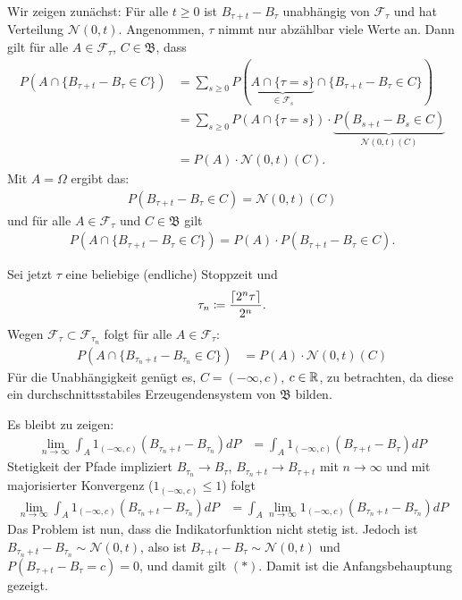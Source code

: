 \documentclass[a4paper,twoside,DIV15,BCOR12mm]{scrbook}
\newcommand{\cF}{\mathcal F}
\newcommand{\borel}{{\mathfrak B}}
\begin{document}
\begin{beweis}
Wir zeigen zunächst: Für alle $t\ge 0$ ist $B_{\tau+t}-B_\tau$ unabhängig von $\cF_\tau$ und hat Verteilung $\mathcal N(0,t)$. Angenommen, $\tau$ nimmt nur abzählbar viele Werte an. Dann gilt für alle $A\in \cF_\tau$, $C\in \borel$, dass
\begin{align*}
P(A\cap \{B_{\tau + t}-B_\tau \in C\}) 
&= \sum_{s\ge 0} P(\underbrace{A\cap \{\tau = s\}}_{\in \cF_s} \cap \{B_{\tau +t} - B_\tau \in C\}) \\
&= \sum_{s\ge 0} P(A\cap \{\tau =s\})\cdot\underbrace{ P(B_{s+t}-B_s\in C)}_{\mathcal N(0,t)(C)}\\
&= P(A) \cdot \mathcal N(0,t)(C).
\end{align*}
Mit $A=\Omega$ ergibt das: 
\begin{align*}
P(B_{\tau + t} - B_\tau \in C) = \mathcal N(0,t)(C)
\end{align*}
und für alle $A\in \cF_\tau $ und $C\in \borel$ gilt
\begin{align*}
P(A\cap \{B_{\tau +t} - B_\tau \in C\}) = P(A) \cdot P(B_{\tau +t}-B_\tau\in C).
\end{align*}

Sei jetzt $\tau$ eine beliebige (endliche) Stoppzeit und 
\begin{align*}
\tau_n \da \frac{ \lceil 2^n\tau \rceil}{2^n}.
\end{align*}
Wegen $\cF_\tau\subset\cF_{\tau_n}$ folgt für alle $A\in\cF_\tau$:
\begin{align*}
P(A \cap \{B_{\tau_n+t} - B_{\tau_n}\in C\})  
&= P(A) \cdot \mathcal N(0,t)(C)
\end{align*}
Für die Unabhängigkeit genügt es, $C=(-\infty, c)$, $c\in \mathbb{R}$, zu betrachten, da diese ein durchschnittsstabiles Erzeugendensystem von $\borel$ bilden.

Es bleibt zu zeigen:
\begin{align*}
\lim_{n\to\infty} \int_A 1_{(-\infty,c)} (B_{\tau_n +t}- B_{\tau_n}) dP 
&= \int_A 1_{(-\infty,c)} (B_{\tau+t}-B_\tau) dP \tag{$*$}
\end{align*}
Stetigkeit der Pfade impliziert $B_{\tau_n} \to B_\tau$, $B_{\tau_n+t}\to B_{\tau+t}$ mit $n\to \infty$ und mit majorisierter Konvergenz ($1_{(-\infty,c)} \le 1$) folgt
\begin{align*}
\lim_{n\to\infty} \int_A 1_{(-\infty,c)} (B_{\tau_n +t} - B_{\tau_n}) dP 
&= \int_A \lim_{n\to\infty} 1_{(-\infty,c)} (B_{\tau_n+t} - B_{\tau_n}) dP
\end{align*}
Das Problem ist nun, dass die Indikatorfunktion nicht stetig ist. Jedoch ist $B_{\tau _n+t}-B_{\tau _n}\sim \mathcal N(0,t)$, also ist $B_{\tau +t} - B_{\tau} \sim \mathcal N(0,t)$ und $P(B_{\tau+t}-B_\tau= c) = 0$, und damit gilt $(*)$.
Damit ist die Anfangsbehauptung gezeigt.


\end{beweis}
\end{document}
